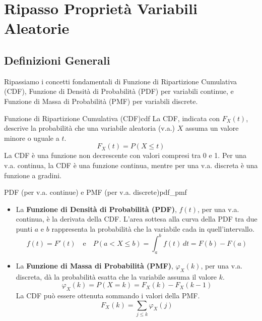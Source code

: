 \section{Ripasso Proprietà Variabili Aleatorie}\label{sec:ripasso_va}

\subsection{Definizioni Generali}\label{ssec:def_generali}
Ripassiamo i concetti fondamentali di Funzione di Ripartizione Cumulativa (CDF), Funzione di Densità di Probabilità (PDF) per variabili continue, e Funzione di Massa di Probabilità (PMF) per variabili discrete.

\begin{definizione}{Funzione di Ripartizione Cumulativa (CDF)}{cdf}
La CDF, indicata con \( F_X(t) \), descrive la probabilità che una variabile aleatoria (v.a.) \( X \) assuma un valore minore o uguale a \( t \).
\[
F_X(t) = P(X \le t)
\]
La CDF è una funzione non decrescente con valori compresi tra 0 e 1. Per una v.a. continua, la CDF è una funzione continua, mentre per una v.a. discreta è una funzione a gradini.
\end{definizione}

\begin{definizione}{PDF (per v.a. continue) e PMF (per v.a. discrete)}{pdf_pmf}
\begin{itemize}
    \item La \textbf{Funzione di Densità di Probabilità (PDF)}, \( f(t) \), per una v.a. continua, è la derivata della CDF. L'area sottesa alla curva della PDF tra due punti \( a \) e \( b \) rappresenta la probabilità che la variabile cada in quell'intervallo.
    \[
    f(t) = F'(t) \quad \text{e} \quad P(a < X \le b) = \int_a^b f(t) \,dt = F(b) - F(a)
    \]
    \item La \textbf{Funzione di Massa di Probabilità (PMF)}, \( \varphi_X(k) \), per una v.a. discreta, dà la probabilità esatta che la variabile assuma il valore \( k \).
    \[
    \varphi_X(k) = P(X = k) = F_X(k) - F_X(k-1)
    \]
    La CDF può essere ottenuta sommando i valori della PMF.
    \[
    F_X(k) = \sum_{j \le k} \varphi_X(j)
    \]
\end{itemize}
\end{definizione}


